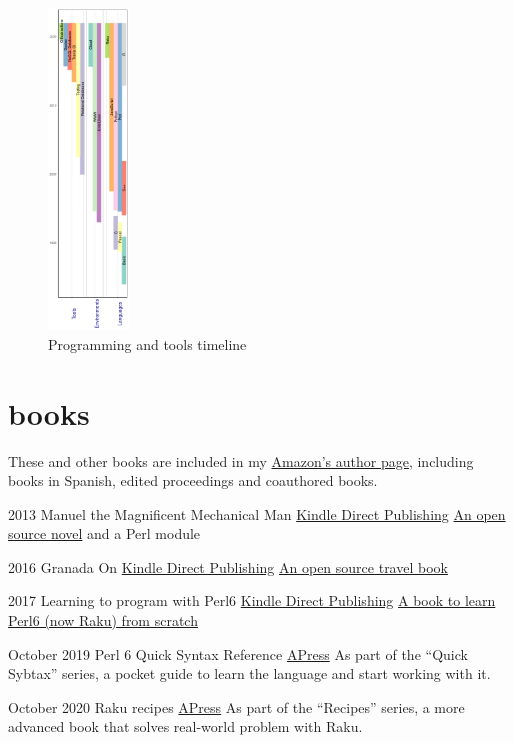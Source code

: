 \documentclass[]{friggeri-jj-cv}
\begin{document}
\begin{figure}
    \centering
    \includegraphics[width=0.19\textwidth]{img/timeline.png}
    \caption{Programming and tools timeline}
\end{figure}

\newpage

\section{books}

These and other books are included in my
\href{https://amazon.com/author/jjmerelo}{Amazon's author page},
including books in Spanish, edited proceedings and coauthored books.

\begin{entrylist}
  \entry
    {2013}
    {Manuel the Magnificent Mechanical Man}
    {\href{http://www.amazon.com/dp/B00ED084BK/}{Kindle Direct Publishing}}
    {\href{http://jj.github.io/hoborg}{An open source novel} and a
      Perl module}

  \entry
    {2016}
    {Granada On}
    {\href{https://www.amazon.com/Granada-Beaten-Track-explorations-Andalusia/dp/1523257083}{Kindle Direct Publishing}}
    {\href{http://github.com/JJ/granada-off}{An open source travel book}}

  \entry
    {2017}
    {Learning to program with Perl6}
    {\href{https://www.amazon.com/Learning-program-Perl-Getting-programming/dp/1521795789/ref=sr_1_1?ie=UTF8&qid=1518685809&sr=8-1}{Kindle Direct Publishing}}
    {\href{http://github.com/JJ/perl6em}{A book to learn Perl6 (now
        Raku) from scratch}}

    \entry
    {October 2019}
    {Perl 6 Quick Syntax Reference}
    {\href{https://www.apress.com/gp/book/9781484249550}{APress}}
    {As part of the ``Quick Sybtax'' series, a pocket guide to learn
      the language and start working with it. }

  \entry
    {October 2020}
    {Raku recipes}
    {\href{https://www.apress.com/gp/book/9781484262573}{APress}}
    {As part of the ``Recipes'' series, a more advanced book that
      solves real-world problem with Raku. }

  \end{entrylist}
\end{document}
